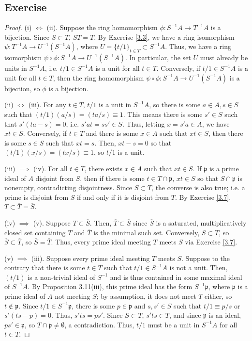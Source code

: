 \subsection{Exercise}\label{3.8}

\begin{proof}
(i) $\iff$ (ii). Suppose the ring homomorphism $\phi : S^{-1}A \to T^{-1}A$ is a bijection. Since $S \subset T$, $ST = T$. By Exercise \ref{3.3}, we have a ring isomorphism $\psi : T^{-1}A \to U^{-1}(S^{-1}A)$, 
where $U = \{t/1\}_{t \in T} \subset S^{-1}A$. Thus, we have a ring isomorphism $\psi \circ \phi : S^{-1}A \to U^{-1}(S^{-1}A)$. In particular, the set $U$ must already be units in $S^{-1}A$, i.e.
$t/1 \in S^{-1}A$ is a unit for all $t \in T$. Conversely, if $t/1 \in S^{-1}A$ is a unit for all $t \in T$, then the ring homomorphism $\psi \circ \phi : S^{-1}A \to U^{-1}(S^{-1}A)$ is a bijection, so $\phi$ is
a bijection.

(ii) $\iff$ (iii). For any $t \in T$, $t/1$ is a unit in $S^{-1}A$, so there is some $a \in A, s \in S$ such that $(t/1)(a/s) = (ta/s) \equiv 1$. This means there is some $s' \in S$ such that
$s'(ta - s) = 0$, i.e. $s'at = ss' \in S$. Thus, letting $x = s'a \in A$, we have $xt \in S$. Conversely, if $t \in T$ and there is some $x \in A$ such that $xt \in S$, then there is some $s \in S$ such that
$xt = s$. Then, $xt - s = 0$ so that $(t/1)(x/s) = (tx/s) \equiv 1$, so $t/1$ is a unit.

(iii) $\implies$ (iv). For all $t \in T$, there exists $x \in A$ such that $xt \in S$. If $\mathfrak{p}$ is a prime ideal of $A$ disjoint from $S$, then if there is some $t \in T \cap \mathfrak{p}$,
$xt \in S$ so that $S \cap \mathfrak{p}$ is nonempty, contradicting disjointness. Since $S \subset T$, the converse is also true; i.e. a prime is disjoint from $S$ if and only if it is disjoint from $T$. By Exercise \ref{3.7},
$T \subset \overline{T} = \overline{S}$.

(iv) $\implies$ (v). Suppose $T \subset \overline{S}$. Then, $\overline{T} \subset \overline{S}$ since $\overline{S}$ is a saturated, multiplicatively closed set containing $T$ and $\overline{T}$ is the minimal such set. Conversely,
$S \subset T$, so $\overline{S} \subset \overline{T}$, so $\overline{S} = \overline{T}$. Thus, every prime ideal meeting $T$ meets $S$ via Exercise \ref{3.7}.

(v) $\implies$ (iii). Suppose every prime ideal meeting $T$ meets $S$. Suppose to the contrary that there is some $t \in T$ such that $t/1 \in S^{-1}A$ is not a unit. Then, $(t/1)$ is a non-trivial ideal of $S^{-1}$
and is thus contained in some maximal ideal of $S^{-1}A$. By Proposition 3.11(iii), this prime ideal has the form $S^{-1}\mathfrak{p}$, where $\mathfrak{p}$ is a prime ideal of $A$ not meeting $S$; by assumption, it does
not meet $T$ either, so $t \not\in \mathfrak{p}$. Since $t/1 \in S^{-1}\mathfrak{p}$, there is some $p \in \mathfrak{p}$ and $s,s' \in S$ such that $t/1 \equiv p/s$ or $s'(ts - p) = 0$. Thus, $s'ts = ps'$. Since $S \subset T$,
$s'ts \in T$, and since $\mathfrak{p}$ is an ideal, $ps' \in \mathfrak{p}$, so $T \cap \mathfrak{p} \neq \emptyset$, a contradiction. Thus, $t/1$ must be a unit in $S^{-1}A$ for all $t \in T$.


\end{proof}
